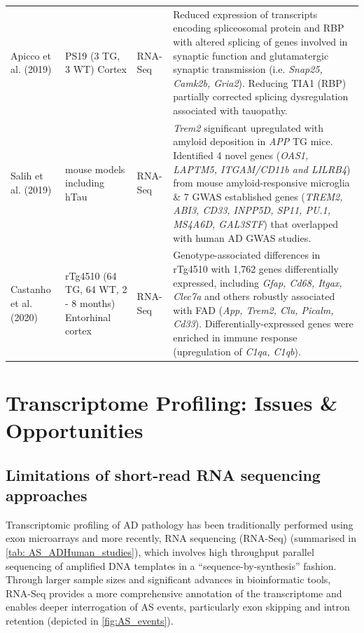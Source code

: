 \begin{landscape}
\begin{longtable}[c]{p{3cm}p{4cm}p{3cm}p{16cm}}
		\centering Apicco et al. (2019) \cite{Apicco2019} &
		\centering PS19 (3 TG, 3 WT) \newline Cortex &
		\centering RNA-Seq &
		\tabitem Reduced expression of transcripts encoding spliceosomal protein and RBP with altered splicing of genes involved in synaptic function and glutamatergic synaptic transmission (i.e. \textit{Snap25, Camk2b, Gria2}). \newline
		\tabitem Reducing TIA1 (RBP) partially corrected splicing dysregulation associated with tauopathy. \\
		\hdashline[0.5pt/5pt]
		
		\centering Salih et al. (2019) \cite{Salih2019} &
		\centering 5 mouse models including hTau   &
		\centering RNA-Seq &
		\tabitem \textit{Trem2} significant upregulated with amyloid deposition in \textit{APP} TG mice. \newline
		\tabitem Identified 4 novel genes (\textit{OAS1, LAPTM5, ITGAM/CD11b and LILRB4}) from mouse amyloid-responsive microglia \& 7 GWAS established genes (\textit{TREM2, ABI3, CD33, INPP5D, SP11, PU.1, MS4A6D, GAL3STF}) that overlapped with human AD GWAS studies. \\
		\hdashline[0.5pt/5pt]
		
		\centering Castanho et al. (2020) \cite{Castanho2020} &
		\centering rTg4510 (64 TG, 64 WT, 2 - 8 months) \newline Entorhinal cortex &
		\centering RNA-Seq &
		\tabitem Genotype-associated differences in rTg4510 with 1,762 genes differentially expressed, including \textit{Gfap, Cd68, Itgax, Clec7a} and others robustly associated with FAD (\textit{App, Trem2, Clu, Picalm, Cd33}).  \newline
		\tabitem Differentially-expressed genes were enriched in immune response (upregulation of \textit{C1qa, C1qb}).\\* \bottomrule
	\end{longtable}
\end{landscape}
\restoregeometry


\section{Transcriptome Profiling: Issues \& Opportunities}
\subsection{Limitations of short-read RNA sequencing approaches}
\label{rnaseq_intro}
Transcriptomic profiling of AD pathology has been traditionally performed using exon microarrays and more recently, RNA sequencing (RNA-Seq) (summarised in \cref{tab: AS_ADHuman_studies}), which involves high throughput parallel sequencing of amplified DNA templates in a “sequence-by-synthesis” fashion. Through larger sample sizes and significant advances in bioinformatic tools, RNA-Seq provides a more comprehensive annotation of the transcriptome and enables deeper interrogation of AS events, particularly exon skipping and intron retention (depicted in \cref{fig:AS_events}). 

